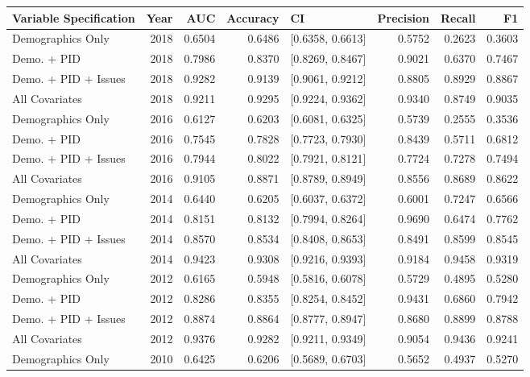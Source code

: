 \begin{table}[ht]
\centering
\begin{tabular}{lrrrlrrr}
  \toprule
Variable Specification & Year & AUC & Accuracy & CI & Precision & Recall & F1 \\ 
  \midrule
Demographics Only & 2018 & 0.6504 & 0.6486 & [0.6358, 0.6613] & 0.5752 & 0.2623 & 0.3603 \\ 
  Demo. + PID & 2018 & 0.7986 & 0.8370 & [0.8269, 0.8467] & 0.9021 & 0.6370 & 0.7467 \\ 
  Demo. + PID + Issues & 2018 & 0.9282 & 0.9139 & [0.9061, 0.9212] & 0.8805 & 0.8929 & 0.8867 \\ 
  All Covariates & 2018 & 0.9211 & 0.9295 & [0.9224, 0.9362] & 0.9340 & 0.8749 & 0.9035 \\ 
  Demographics Only & 2016 & 0.6127 & 0.6203 & [0.6081, 0.6325] & 0.5739 & 0.2555 & 0.3536 \\ 
  Demo. + PID & 2016 & 0.7545 & 0.7828 & [0.7723, 0.7930] & 0.8439 & 0.5711 & 0.6812 \\ 
  Demo. + PID + Issues & 2016 & 0.7944 & 0.8022 & [0.7921, 0.8121] & 0.7724 & 0.7278 & 0.7494 \\ 
  All Covariates & 2016 & 0.9105 & 0.8871 & [0.8789, 0.8949] & 0.8556 & 0.8689 & 0.8622 \\ 
  Demographics Only & 2014 & 0.6440 & 0.6205 & [0.6037, 0.6372] & 0.6001 & 0.7247 & 0.6566 \\ 
  Demo. + PID & 2014 & 0.8151 & 0.8132 & [0.7994, 0.8264] & 0.9690 & 0.6474 & 0.7762 \\ 
  Demo. + PID + Issues & 2014 & 0.8570 & 0.8534 & [0.8408, 0.8653] & 0.8491 & 0.8599 & 0.8545 \\ 
  All Covariates & 2014 & 0.9423 & 0.9308 & [0.9216, 0.9393] & 0.9184 & 0.9458 & 0.9319 \\ 
  Demographics Only & 2012 & 0.6165 & 0.5948 & [0.5816, 0.6078] & 0.5729 & 0.4895 & 0.5280 \\ 
  Demo. + PID & 2012 & 0.8286 & 0.8355 & [0.8254, 0.8452] & 0.9431 & 0.6860 & 0.7942 \\ 
  Demo. + PID + Issues & 2012 & 0.8874 & 0.8864 & [0.8777, 0.8947] & 0.8680 & 0.8899 & 0.8788 \\ 
  All Covariates & 2012 & 0.9376 & 0.9282 & [0.9211, 0.9349] & 0.9054 & 0.9436 & 0.9241 \\ 
  Demographics Only & 2010 & 0.6425 & 0.6206 & [0.5689, 0.6703] & 0.5652 & 0.4937 & 0.5270 \\ 

\end{tabular}
\end{table}

